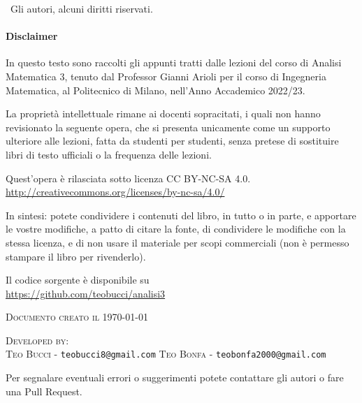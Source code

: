 
\textcopyright \ Gli autori, alcuni diritti riservati.

\paragraph{Disclaimer} In questo testo sono raccolti gli appunti tratti dalle lezioni del corso di Analisi Matematica 3, tenuto dal Professor Gianni Arioli per il corso di Ingegneria Matematica, al Politecnico di Milano, nell'Anno Accademico 2022/23.

La proprietà intellettuale rimane ai docenti sopracitati, i quali non hanno revisionato la seguente opera, che si presenta unicamente come un supporto ulteriore alle lezioni, fatta da studenti per studenti, senza pretese di sostituire libri di testo ufficiali o la frequenza delle lezioni.

Quest'opera è rilasciata sotto licenza CC BY-NC-SA 4.0.\\
\url{http://creativecommons.org/licenses/by-nc-sa/4.0/}

In sintesi: potete condividere i contenuti del libro, in tutto o in parte, e apportare le vostre modifiche, a patto di citare la fonte, di condividere le modifiche con la stessa licenza, e di non usare il materiale per scopi commerciali (non è permesso stampare il libro per rivenderlo).

Il codice sorgente \latex è disponibile su \\
\url{https://github.com/teobucci/analisi3}


\textsc{Documento creato il \today}


\textsc{Developed by:}\\
\textsc{Teo Bucci} - \texttt{teobucci8@gmail.com}
\textsc{Teo Bonfa} - \texttt{teobonfa2000@gmail.com}


Per segnalare eventuali errori o suggerimenti potete contattare gli autori o fare una Pull Request.

